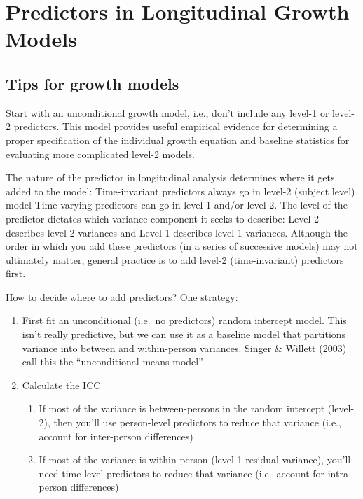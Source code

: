 \documentclass[
  letterpaper,
  DIV=11,
  numbers=noendperiod]{scrreprt}
\begin{document}
\hypertarget{predictors-in-longitudinal-growth-models}{%
\chapter{Predictors in Longitudinal Growth
Models}\label{predictors-in-longitudinal-growth-models}}

\hypertarget{tips-for-growth-models}{%
\section{Tips for growth models}\label{tips-for-growth-models}}

Start with an unconditional growth model, i.e., don't include any
level-1 or level-2 predictors. This model provides useful empirical
evidence for determining a proper specification of the individual growth
equation and baseline statistics for evaluating more complicated level-2
models.

The nature of the predictor in longitudinal analysis determines where it
gets added to the model: Time-invariant predictors always go in level-2
(subject level) model Time-varying predictors can go in level-1 and/or
level-2. The level of the predictor dictates which variance component it
seeks to describe: Level-2 describes level-2 variances and Level-1
describes level-1 variances. Although the order in which you add these
predictors (in a series of successive models) may not ultimately matter,
general practice is to add level-2 (time-invariant) predictors first.

How to decide where to add predictors? One strategy:

\begin{enumerate}
\def\labelenumi{\arabic{enumi}.}
\item
  First fit an unconditional (i.e.~no predictors) random intercept
  model. This isn't really predictive, but we can use it as a baseline
  model that partitions variance into between and within-person
  variances. Singer \& Willett (2003) call this the ``unconditional
  means model''.
\item
  Calculate the ICC

  \begin{enumerate}
  \def\labelenumii{\arabic{enumii}.}
  \item
    If most of the variance is between-persons in the random intercept
    (level-2), then you'll use person-level predictors to reduce that
    variance (i.e., account for inter-person differences)
  \item
    If most of the variance is within-person (level-1 residual
    variance), you'll need time-level predictors to reduce that variance
    (i.e.~account for intra-person differences)
  \end{enumerate}
\end{enumerate}
\end{document}
